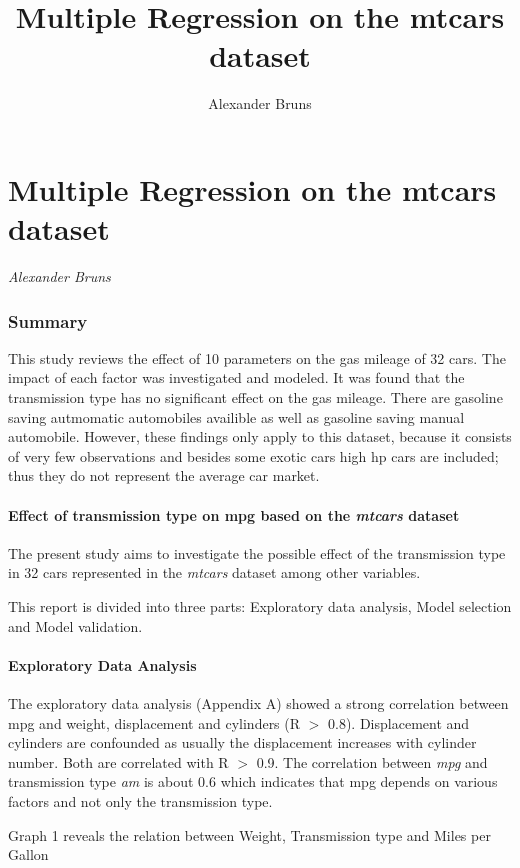 \documentclass[10pt,a4paper]{article}
\author{Alexander Bruns}
\title{Multiple Regression on the mtcars dataset}
\begin{document}
	\part{Multiple Regression on the mtcars dataset}
	\textit{Alexander Bruns}
	\section{Summary}
	This study reviews the effect of 10 parameters on the gas mileage of 32 cars. The impact of each factor was investigated and modeled. 
	It was found that the transmission type has no significant effect on the gas mileage. There are gasoline saving autmomatic automobiles availible as well as gasoline saving manual automobile.
	However, these findings only apply to this dataset, because it consists of very few  observations and besides some exotic cars high hp cars are included; thus they do not represent the average car market.
	\subsection{Effect of transmission type on mpg based on the \textit{mtcars} dataset}
	
	The present study aims to investigate the possible effect of the transmission type in 32 cars represented in the \textit{mtcars} dataset among other variables.
	
	This report is divided into three parts: Exploratory data analysis, Model selection and Model validation.
	
	\subsection{Exploratory Data Analysis}
	
	The exploratory data analysis (Appendix A) showed a strong correlation between mpg and weight, displacement and cylinders (R $>$ 0.8). Displacement and cylinders are confounded as usually the displacement increases with cylinder number. Both are correlated with R $>$ 0.9. The correlation between \textit{mpg} and transmission type \textit{am} is about 0.6 which indicates that mpg depends on various factors and not only the transmission type. 
	
	Graph 1 reveals the relation between Weight, Transmission type and Miles per Gallon
	
\end{document}
